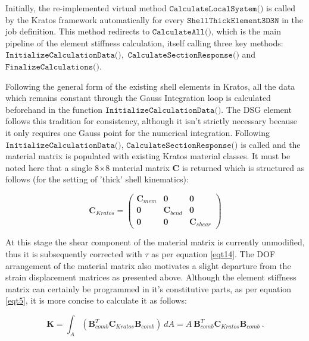Initially, the re-implemented virtual method $\texttt{CalculateLocalSystem()}$ is called by the Kratos framework automatically for every $\texttt{ShellThickElement3D3N}$ in the job definition. This method redirects to $\texttt{CalculateAll()}$, which is the main pipeline of the element stiffness calculation, itself calling three key methods: $\texttt{InitializeCalculationData()},$ \break$\texttt{CalculateSectionResponse()}$ and $\texttt{FinalizeCalculations()}$.

Following the general form of the existing shell elements in Kratos, all the data which remains constant through the Gauss Integration loop is calculated beforehand in the function $\texttt{InitializeCalculationData()}$. The DSG element follows this tradition for consistency, although it isn't strictly necessary because it only requires one Gauss point for the numerical integration. Following $\texttt{InitializeCalculationData()}$, $\texttt{CalculateSectionResponse()}$ is called and the material matrix is populated with existing Kratos material classes. It must be noted here that a single 8$\times$8 material matrix $\mathbf{C}$ is returned which is structured as follows (for the setting of 'thick' shell kinematics):

\begin{equation} 
\mathbf{C}_{Kratos} =  
\begin{pmatrix}
	\mathbf{C}_{mem} & \mathbf{0} & \mathbf{0} \\
	\mathbf{0} & \mathbf{C}_{bend} & \mathbf{0} \\
	\mathbf{0} & 	\mathbf{0} & \mathbf{C}_{shear}
\end{pmatrix}
\label{eqtCkratos}
\end{equation} 

At this stage the shear component of the material matrix is currently unmodified, thus it is subsequently corrected with $\tau$ as per equation \eqref{eqt14}. The DOF arrangement of the material matrix also motivates a slight departure from the strain displacement matrices as presented above. Although the element stiffness matrix can certainly be programmed in it's constitutive parts, as per equation \eqref{eqt5}, it is more concise to calculate it as follows:

\begin{equation} 
\mathbf{K} = \int_A  (\mathbf{B}_{comb}^T \mathbf{C}_{Kratos} \mathbf{B}_{comb} )\ dA
= A\  \mathbf{B}_{comb}^T \mathbf{C}_{Kratos} \mathbf{B}_{comb} 
\label{eqtKkratos}\ .
\end{equation}

